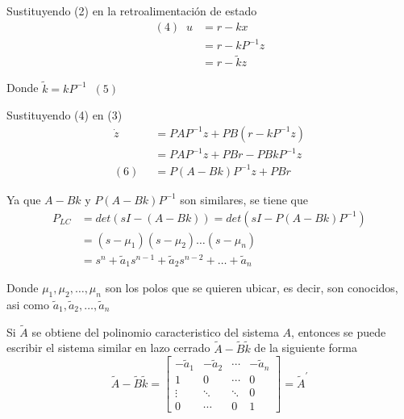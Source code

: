 Sustituyendo (2) en la retroalimentación de estado
\[
    \begin{split}
       (4) \;\;u & = r - kx\\
        & = r - kP^{-1}z\\
        & = r - \tilde{k}z
    \end{split}
\]

Donde \( \tilde{k}=kP^{-1} \;\; (5) \)

Sustituyendo (4) en (3)
\[
    \begin{split}
        \dot{z} & = PAP^{-1}z + PB(r-kP^{-1}z) \\
        & = PAP^{-1}z + PBr - PBkP^{-1}z \\
      (6) \;\;  & = P(A-Bk)P^{-1}z + PBr
    \end{split}
\]

Ya que \( A-Bk \) y \(P(A-Bk)P^{-1}\) son similares, se tiene que
\[
    \begin{split}
        P_{LC} & = det(sI-(A-Bk)) = det(sI-P(A-Bk)P^{-1})\\
        & = (s-\mu_{1}) (s-\mu_{2}) \ldots (s-\mu_{n})\\
        & = s^{n} +\tilde{a}_{1}s^{n-1} + \tilde{a}_{2}s^{n-2} + \ldots + \tilde{a}_{n}
    \end{split}
\]

Donde \( \mu_{1}, \mu_{2}, \ldots, \mu_{n} \) son los polos que se quieren ubicar, es decir, son conocidos, asi como \( \tilde{a}_{1},\tilde{a}_{2}, \ldots, \tilde{a}_{n} \)

Si \( \tilde{A} \) se obtiene del polinomio caracteristico del sistema \( A \), entonces se puede escribir el sistema similar en lazo cerrado \( \tilde{A}-\tilde{B}\tilde{k} \) de la siguiente forma
\[
    \tilde{A}-\tilde{B}\tilde{k}=
    \begin{bmatrix}
        -\tilde{a}_{1} & -\tilde{a}_{2} & \cdots & -\tilde{a}_{n} \\
        1 & 0 & \cdots & 0 \\
        \vdots & \ddots & \ddots & 0 \\
        0 & \cdots & 0 & 1
    \end{bmatrix} = \tilde{A}^{'}
\]

